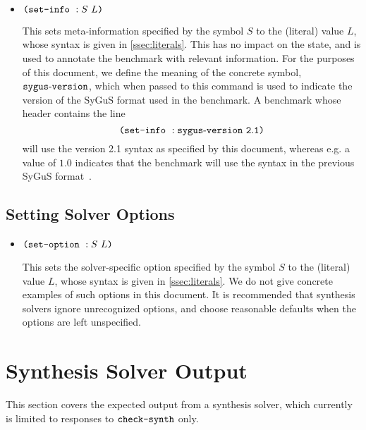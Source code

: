 \documentclass[english,a4paper,10pt]{article}
\begin{document}
\begin{itemize}
\item $\texttt{(}\texttt{set-info}\mbox{ }:S\mbox{ }L\texttt{)}$

This sets meta-information specified by the symbol $S$
to the (literal) value $L$, whose syntax is given in \cref{ssec:literals}.
This has no impact on the state, and is used to annotate the
benchmark with relevant information.
For the purposes of this document, we define the meaning of
the concrete symbol, ${\tt sygus\mbox{-}version}$,
which when passed to this command is used to indicate the version of the SyGuS
format used in the benchmark.
A benchmark whose header contains the line
\[
\texttt{(}\texttt{set-info}\mbox{ }:{\tt sygus\mbox{-}version\mbox{ }2.1}\texttt{)}
\]
will use the version 2.1 syntax as specified by this document,
whereas e.g. a value of $1.0$ indicates that the benchmark will use the
syntax in the previous SyGuS format~\cite{sygusFormat,sygusSyntax2015,sygusSyntax2016}.
\end{itemize}
\subsection{Setting Solver Options}

\begin{itemize}
\item $\texttt{(}\texttt{set-option}\mbox{ }:S\mbox{ }L\texttt{)}$

This sets the solver-specific option specified by the symbol $S$ 
to the (literal) value $L$, whose syntax is given in \cref{ssec:literals}.
We do not give concrete examples of such options in this document. %
It is recommended that synthesis solvers
ignore unrecognized options, 
and choose reasonable defaults when the
options are left unspecified.
\end{itemize}

\section{Synthesis Solver Output}%
\label{sec:output}

This section covers the expected output from a synthesis solver,
which currently is limited to responses to $\texttt{check-synth}$ 
only.
\end{document}
